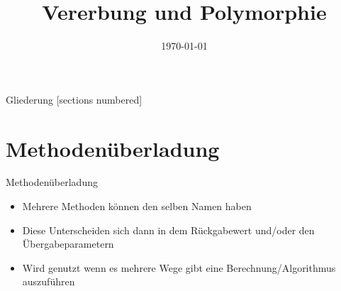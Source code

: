 



\title{Vererbung und Polymorphie}
\date{\today}




\maketitle

\begin{frame}{Gliederung}
	[sections numbered]
	\tableofcontents
\end{frame}

\section{Methodenüberladung}
\begin{frame}{Methodenüberladung}
	\begin{itemize}
		\item Mehrere Methoden können den selben Namen haben
		\item Diese Unterscheiden sich dann in dem Rückgabewert und/oder den Übergabeparametern
		\item Wird genutzt wenn es mehrere Wege gibt eine Berechnung/Algorithmus auszuführen
	\end{itemize}
	
\end{frame}

